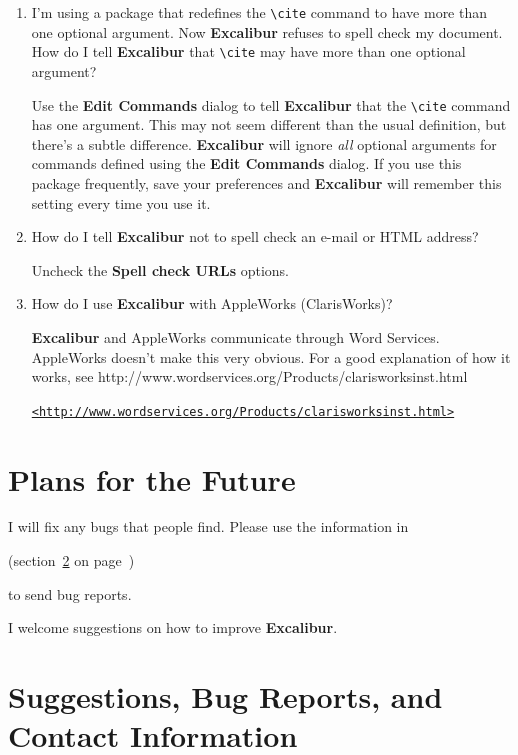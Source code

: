 ﻿\documentclass[11pt,titlepage]{article}
\newcommand{\ex}{\textbf{Excalibur}}
\begin{document}
\begin{enumerate}
\item I'm using a package that redefines the \verb+\cite+ command to
  have more than one optional argument.  Now \ex{} refuses to spell
  check my document.  How do I tell \ex{} that \verb+\cite+ may have
  more than one optional argument?

  Use the \textbf{Edit Commands} dialog to tell \ex{} that the
  \verb+\cite+ command has one argument.  This may not seem different
  than the usual definition, but there's a subtle difference.  \ex{}
  will ignore \emph{all} optional arguments for commands defined using
  the \textbf{Edit Commands} dialog.  If you use this package
  frequently, save your preferences and \ex{} will remember this
  setting every time you use it.

\item How do I tell \ex{} not to spell check an e-mail or HTML
  address?

  Uncheck the \textbf{Spell check URLs} options.

\item How do I use \ex{} with AppleWorks (ClarisWorks)?

  \ex{} and AppleWorks communicate through Word Services. AppleWorks
  doesn't make this very obvious.  For a good explanation of how it
  works, see 
  {http://www.wordservices.org/Products/clarisworksinst.html}
  \begin{latexonly}
\begin{alltt}
\url{<http://www.wordservices.org/Products/clarisworksinst.html>}
\end{alltt}
  \end{latexonly}

\end{enumerate}

\section{Plans for the Future}

I will fix any bugs that people find. Please use the information in
\begin{latexonly}
  (section~\ref{sec:bugs} on page~\pageref{sec:bugs})
\end{latexonly}
to send bug reports.

I welcome suggestions on how to improve \ex.

\section{Suggestions, Bug Reports, and Contact Information}
\label{sec:bugs}
\end{document}
